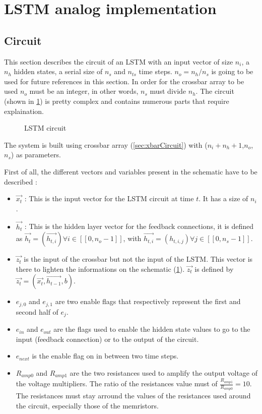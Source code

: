 \section{\ac{LSTM} analog implementation}\label{sec:lstmCircuit}

\subsection{Circuit}

This section describes the circuit of an \ac{LSTM} with an input vector of size $n_i$, a $n_h$ hidden states, a serial size of $n_s$ and $n_{ts}$ time steps. $n_o=n_h/n_s$ is going to be used for future references in this section. In order for the crossbar array to be used $n_o$ must be an integer, in other words, $n_s$ must divide $n_h$. The circuit (shown in \cref{circt:lstm}) is pretty complex and contains numerous parts that require explaination.

\begin{figure}[H]
  \centering
  
  \caption{\ac{LSTM} circuit}
  \label{circt:lstm}
\end{figure}

The system is built using crossbar array (\cref{sec:xbarCircuit}) with ($n_i+n_h+1$,$n_o$, $n_s$) as parameters.

First of all, the different vectors and variables present in the schematic have to be described :

\begin{itemize}
  \item $\overrightarrow{x_t}$ : This is the input vector for the \ac{LSTM} circuit at time $t$. It has a size of $n_i$.
  \item $\overrightarrow{h_t}$ : This is the hidden layer vector for the feedback connections, it is defined as $\overrightarrow{h_t}=(\overrightarrow{h_{t,i}}) \forall i\in [\![0,n_o-1]\!]$, with $\overrightarrow{h_{t,i}}=(h_{t,i,j}) \forall j\in [\![0,n_s-1]\!]$.
  \item $\overrightarrow{z_t}$ is the input of the crossbar but not the input of the \ac{LSTM}. This vector is there to lighten the informations on the schematic (\cref{circt:lstm}). $\overrightarrow{z_t}$ is defined by $\overrightarrow{z_t}=(\overrightarrow{x_t},\overrightarrow{h_{t-1}},b)$.
  \item $e_{j,0}$ and $e_{j,1}$ are two enable flags that respectively represent the first and second half of $e_j$.
  \item $e_{in}$ and $e_{out}$ are the flags used to enable the hidden state values to go to the input (feedback connection) or to the output of the circuit.
  \item $e_{next}$ is the enable flag on in between two time steps.
  \item $R_{amp0}$ and $R_{amp1}$ are the two resistances used to amplify the output voltage of the voltage multipliers. The ratio of the resistances value must of $\frac{R_{amp1}}{R_{amp0}}=10$. The resistances must stay arround the values of the resistances used around the circuit, especially those of the memristors.
\end{itemize}

